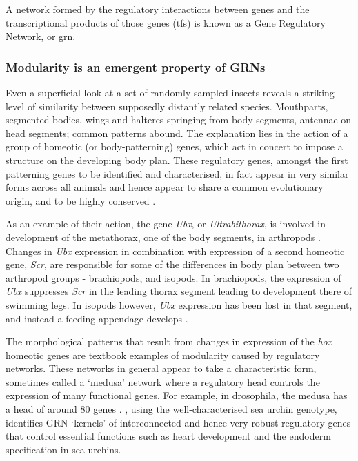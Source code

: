 A network formed by the regulatory interactions between genes and the transcriptional products of those genes (\glspl{tf}) is known as a Gene Regulatory Network, or \gls{grn}.

\subsubsection{Modularity is an emergent property of GRNs}
Even a superficial look at a set of randomly sampled insects reveals a striking level of similarity between supposedly distantly related species. Mouthparts, segmented bodies, wings and halteres springing from body segments, antennae on head segments; common patterns abound. The explanation lies in the action of a group of homeotic (or body-patterning) genes, which act in concert to impose a structure on the developing body plan. These regulatory genes, amongst the first patterning genes to be identified and characterised, in fact appear in very similar forms across all animals and hence appear to share a common evolutionary origin, and to be highly conserved \parencite{Shubin:2009vw}. 

As an example of their action, the gene \emph{Ubx}, or \emph{Ultrabithorax}, is involved in development of the \gls{metathorax}, one of the body segments, in \glspl{arthropod} \parencite[pg. 696-697]{Watson:2008fm}. Changes in \emph{Ubx} expression in combination with expression of a second homeotic gene, \emph{Scr}, are responsible for some of the differences in body plan between two arthropod groups - brachiopods, and isopods. In brachiopods, the expression of \emph{Ubx} suppresses \emph{Scr} in the leading thorax segment leading to development there of swimming legs. In isopods however, \emph{Ubx} expression has been lost in that segment, and instead a feeding appendage develops \parencite{Watson:2008fm}.

The morphological patterns that result from changes in expression of the \emph{hox} homeotic genes are textbook examples of modularity caused by regulatory networks. These networks in general appear to take a characteristic form, sometimes called a `medusa' network \parencite{Kauffman:2004zi,Aldana:2007da} where a regulatory head controls the expression of many functional genes. For example, in \gls{drosophila}, the medusa has a head of around 80 genes \parencite{Aldana:2007da}. \Textcite{Davidson:2006wi}, using the well-characterised sea urchin genotype, identifies GRN `kernels' of interconnected and hence very robust regulatory genes that control essential functions such as heart development and the endoderm specification in sea urchins. 

